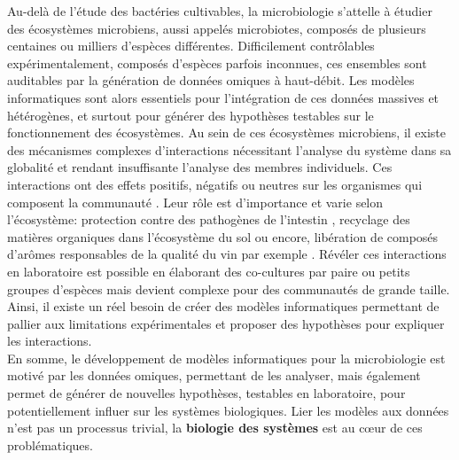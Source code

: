 Au-delà de l’étude des bactéries cultivables, la microbiologie s’attelle à étudier des écosystèmes microbiens, aussi appelés microbiotes, composés de plusieurs centaines ou milliers d’espèces différentes. Difficilement contrôlables expérimentalement, composés d’espèces parfois inconnues, ces ensembles sont auditables par la génération de données omiques à haut-débit. Les modèles informatiques sont alors essentiels pour l’intégration de ces données massives et hétérogènes, et surtout pour générer des hypothèses testables sur le fonctionnement des écosystèmes.  Au sein de ces écosystèmes microbiens, il existe des mécanismes complexes d'interactions nécessitant l’analyse du système dans sa globalité et rendant insuffisante l’analyse des membres individuels. Ces interactions ont des effets positifs, négatifs ou neutres sur les organismes qui composent la communauté \citep{Faust2012}. Leur rôle est d’importance et varie selon l'écosystème: protection contre des pathogènes de l'intestin \citep{Zhang2015}, recyclage des matières organiques dans l'écosystème du sol \citep{Hoorman2011, Yadav2018} ou encore, libération de composés d'arômes  \citep{McSweeney2000} responsables de la qualité du vin par exemple \citep{Virdis2021}. Révéler ces interactions en laboratoire est possible en élaborant des co-cultures par paire ou petits groupes d’espèces \citep{Weiss2022} mais devient complexe pour des communautés de grande taille. Ainsi, il existe un réel besoin de créer des modèles informatiques permettant de pallier aux limitations expérimentales et proposer des hypothèses pour expliquer les interactions. \\

En somme, le développement de modèles informatiques pour la microbiologie est motivé par les données omiques, permettant de les analyser, mais également permet de générer de nouvelles hypothèses, testables en laboratoire, pour potentiellement influer sur les systèmes biologiques. Lier les modèles aux données n'est pas un processus trivial, la \textbf{biologie des systèmes} est au c\oe{}ur de ces problématiques.

